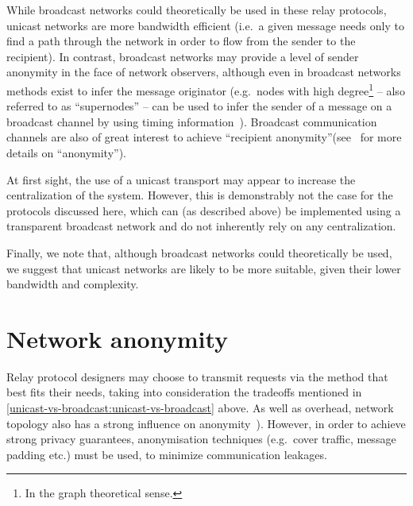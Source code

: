 While broadcast networks could theoretically be used in these relay protocols, unicast networks are more bandwidth efficient (i.e.~a given message needs only to find a path through the network in order to flow from the sender to the recipient). In contrast, broadcast networks may provide a level of sender anonymity in the face of network observers, although even in broadcast networks methods exist to infer the message originator (e.g.~nodes with high degree\footnote{In the graph theoretical sense.} -- also referred to as ``supernodes'' -- can be used to infer the sender of a message on a broadcast channel by using timing information~\cite{DBLP:conf/fc/KoshyKM14}). Broadcast communication channels are also of great interest to achieve ``recipient anonymity''(see~\cite{DBLP:journals/compsec/PfitzmannW87} for more details on ``anonymity'').

At first sight, the use of a unicast transport may appear to increase the centralization of the system. However, this is demonstrably not the case for the protocols discussed here, which can (as described above) be implemented using a transparent broadcast network and do not inherently rely on any centralization.

Finally, we note that, although broadcast networks could theoretically be used, we suggest that unicast networks are likely to be more suitable, given their lower bandwidth and complexity.

\section{Network anonymity}\label{unicast-vs-broadcast:network-anonymity}

Relay protocol designers may choose to transmit requests via the method that best fits their needs, taking into consideration the tradeoffs mentioned in \cref{unicast-vs-broadcast:unicast-vs-broadcast} above. As well as overhead, network topology also has a strong influence on anonymity~\cite{DBLP:conf/pet/DiazMT10}). However, in order to achieve strong privacy guarantees, anonymisation techniques (e.g.~cover traffic, message padding etc.) must be used, to minimize communication leakages.

